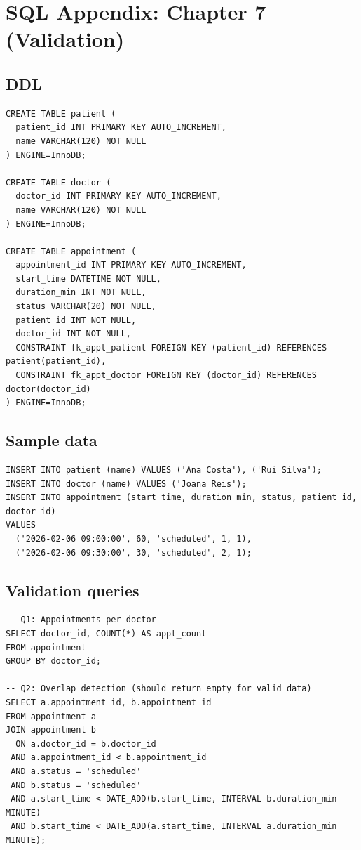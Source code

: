 \chapter{SQL Appendix: Chapter 7 (Validation)}

\section{DDL}
\begin{verbatim}
CREATE TABLE patient (
  patient_id INT PRIMARY KEY AUTO_INCREMENT,
  name VARCHAR(120) NOT NULL
) ENGINE=InnoDB;

CREATE TABLE doctor (
  doctor_id INT PRIMARY KEY AUTO_INCREMENT,
  name VARCHAR(120) NOT NULL
) ENGINE=InnoDB;

CREATE TABLE appointment (
  appointment_id INT PRIMARY KEY AUTO_INCREMENT,
  start_time DATETIME NOT NULL,
  duration_min INT NOT NULL,
  status VARCHAR(20) NOT NULL,
  patient_id INT NOT NULL,
  doctor_id INT NOT NULL,
  CONSTRAINT fk_appt_patient FOREIGN KEY (patient_id) REFERENCES patient(patient_id),
  CONSTRAINT fk_appt_doctor FOREIGN KEY (doctor_id) REFERENCES doctor(doctor_id)
) ENGINE=InnoDB;
\end{verbatim}

\section{Sample data}
\begin{verbatim}
INSERT INTO patient (name) VALUES ('Ana Costa'), ('Rui Silva');
INSERT INTO doctor (name) VALUES ('Joana Reis');
INSERT INTO appointment (start_time, duration_min, status, patient_id, doctor_id)
VALUES
  ('2026-02-06 09:00:00', 60, 'scheduled', 1, 1),
  ('2026-02-06 09:30:00', 30, 'scheduled', 2, 1);
\end{verbatim}

\section{Validation queries}
\begin{verbatim}
-- Q1: Appointments per doctor
SELECT doctor_id, COUNT(*) AS appt_count
FROM appointment
GROUP BY doctor_id;

-- Q2: Overlap detection (should return empty for valid data)
SELECT a.appointment_id, b.appointment_id
FROM appointment a
JOIN appointment b
  ON a.doctor_id = b.doctor_id
 AND a.appointment_id < b.appointment_id
 AND a.status = 'scheduled'
 AND b.status = 'scheduled'
 AND a.start_time < DATE_ADD(b.start_time, INTERVAL b.duration_min MINUTE)
 AND b.start_time < DATE_ADD(a.start_time, INTERVAL a.duration_min MINUTE);
\end{verbatim}
